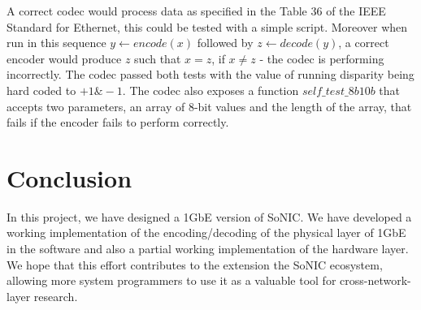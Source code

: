 \documentclass[conference]{IEEEtran}
\begin{document}
A correct codec would process data as specified in the Table 36 of the IEEE Standard for Ethernet\cite{ieeestandard}, this could be tested with a simple script. Moreover when run in this sequence $y\leftarrow encode(x)$ followed by $z\leftarrow decode(y)$, a correct encoder would produce $z$ such that $x=z$, if $x\neq z$ - the codec is performing incorrectly. The codec passed both tests with the value of running disparity being hard coded to $+1 \& -1$. The codec also exposes a function $self\_test\_8b10b$ that accepts two parameters, an array of 8-bit values and the length of the array, that fails if the encoder fails to perform correctly.

\section{Conclusion}

In this project, we have designed a 1GbE version of SoNIC. We have developed a working implementation of the encoding/decoding of the physical layer of 1GbE in the software and also a partial working implementation of the hardware layer. We hope that this effort contributes to the extension the SoNIC ecosystem, allowing more system programmers to use it as a valuable tool for cross-network-layer research.



\end{document}
